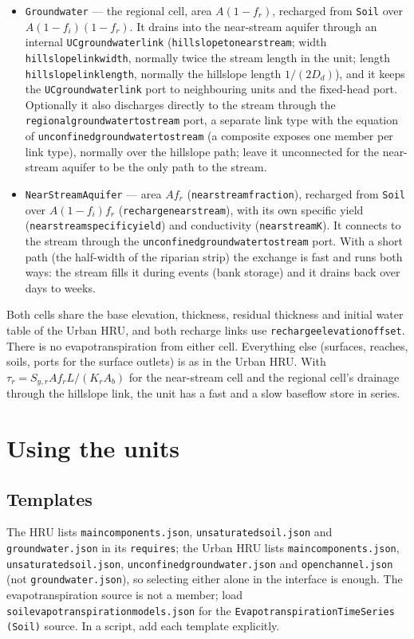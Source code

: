 \documentclass[11pt,a4paper]{article}
\newcommand{\code}[1]{\texttt{\small #1}}
\newcommand{\file}[1]{\texttt{\small #1}}
\renewcommand{\_}{\oldus\allowbreak}   %
\begin{document}
\begin{itemize}[leftmargin=1.4em]
\item \code{Groundwater} --- the regional cell, area $A(1-f_r)$, recharged from \code{Soil\_3} over
      $A(1-f_i)(1-f_r)$. It drains into the near-stream aquifer
      through an internal \code{UC\_groundwater\_link} (\code{hillslope\_to\_near\_stream}; width
      \code{hillslope\_link\_width}, normally twice the stream length in the unit; length
      \code{hillslope\_link\_length}, normally the hillslope length $1/(2D_d)$), and it keeps the
      \code{UC\_groundwater\_link} port to neighbouring units and the fixed-head port. Optionally it also
      discharges directly to the stream through the \code{regional\_groundwater\_to\_stream} port, a separate
      link type with the equation of \code{unconfined\_groundwater\_to\_stream} (a composite exposes one member
      per link type), normally over the hillslope path; leave it unconnected for the near-stream aquifer to be
      the only path to the stream.
\item \code{Near\_Stream\_Aquifer} --- area $A f_r$ (\code{near\_stream\_fraction}), recharged from
      \code{Soil\_3} over $A(1-f_i)f_r$ (\code{recharge\_near\_stream}), with its own specific yield
      (\code{near\_stream\_specific\_yield}) and conductivity (\code{near\_stream\_K}). It connects to the
      stream through the \code{unconfined\_groundwater\_to\_stream} port. With a short
      path (the half-width of the riparian strip) the exchange is fast and runs both ways: the stream fills it
      during events (bank storage) and it drains back over days to weeks.
\end{itemize}

Both cells share the base elevation, thickness, residual thickness and initial water table of the Urban HRU,
and both recharge links use \code{recharge\_elevation\_offset}. There is no evapotranspiration from either
cell. Everything else (surfaces, reaches, soils, ports for the surface outlets) is as in the Urban HRU. With
$\tau_r=S_{y,r}A f_r L/(K_r A_b)$ for the near-stream cell and the regional cell's drainage through the
hillslope link, the unit has a fast and a slow baseflow store in series.

\section{Using the units}

\subsection{Templates}
The HRU lists \file{main\_components.json}, \file{unsaturated\_soil.json} and \file{groundwater.json} in
its \code{requires}; the Urban HRU lists \file{main\_components.json}, \file{unsaturated\_soil.json},
\file{unconfined\_groundwater.json} and \file{open\_channel.json} (not \file{groundwater.json}), so
selecting either alone in the interface is enough. The evapotranspiration source is not a member; load
\file{soil\_evapotranspiration\_models.json} for the \code{Evapotranspiration\_Time\_Series (Soil)}
source. In a script, add each template explicitly.
\end{document}
